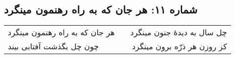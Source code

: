 \begin{center}
\section*{شماره ۱۱: هر جان که به راه رهنمون مینگرد}
\label{sec:011}
\begin{longtable}{l p{0.5cm} r}
هر جان که به راه رهنمون مینگرد
&&
چل سال به دیدهٔ جنون مینگرد
\\
چون چل بگذشت آفتابی بیند
&&
کز روزن هر ذرّه برون مینگرد
\\
\end{longtable}
\end{center}
